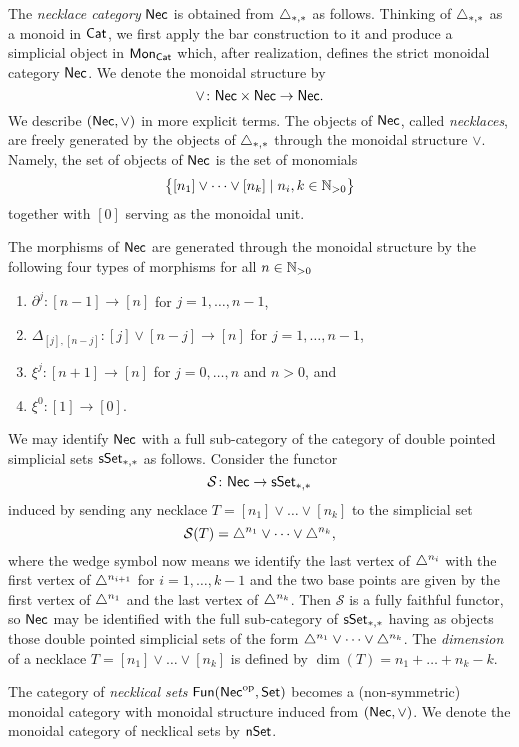 The \textit{necklace category} $\mathsf{Nec}$ is obtained from $\triangle_{*,*}$ as follows.
Thinking of $\triangle_{*,*}$ as a monoid in $\mathsf{Cat}$, we first apply the bar construction to it and produce a simplicial object in $\mathsf{Mon}_{\mathsf{Cat}}$ which, after realization, defines the strict monoidal category $\mathsf{Nec}$.
We denote the monoidal structure by
\[
\vee \colon \mathsf{Nec} \times \mathsf{Nec} \to \mathsf{Nec}.
\]
We describe $(\mathsf{Nec}, \vee)$ in more explicit terms.
The objects of $\mathsf{Nec}$, called \textit{necklaces}, are freely generated by the objects of $\triangle_{*,*}$ through the monoidal structure $\vee$.
Namely, the set of objects of $\mathsf{Nec}$ is the set of monomials
\[
\big\{ [n_1] \vee \dots \vee[n_k] \mid n_i, k \in \mathbb{N}_{>0} \big\}
\]
together with $[0]$ serving as the monoidal unit.

The morphisms of $\mathsf{Nec}$ are generated through the monoidal structure by the following four types of morphisms for all $n \in\mathbb{N}_{>0}$
\begin{enumerate}
	\item $\partial^j \colon [n-1] \to [n]$ for $j = 1, \dots, n-1$,
	\item $\Delta_{[j], [n-j]} \colon [j] \vee [n-j] \to [n]$ for $j = 1, \dots, n-1$,
	\item $\xi^j \colon [n+1] \to [n]$ for $j = 0, \dots, n$ and $n>0$, and
	\item $\xi^0 \colon [1] \to [0]$.
\end{enumerate}
We may identify $\mathsf{Nec}$ with a full sub-category of the category of double pointed simplicial sets $\mathsf{sSet}_{*,*}$ as follows.
Consider the functor
\[
\mathcal{S} \colon \mathsf{Nec} \to \mathsf{sSet}_{*,*}
\]
induced by sending any necklace $T = [n_1] \vee \dots \vee[n_k]$ to the simplicial set
\[
\mathcal{S}(T) = \triangle^{n_1} \vee \dots \vee \triangle^{n_k},
\]
where the wedge symbol now means we identify the last vertex of $\triangle^{n_i}$ with the first vertex of $\triangle^{n_{i+1}}$ for $i = 1, \dots, k-1$ and the two base points are given by the first vertex of $\triangle^{n_1}$ and the last vertex of $\triangle^{n_k}$.
Then $\mathcal{S}$ is a fully faithful functor, so $\mathsf{Nec}$ may be identified with the full sub-category of $\mathsf{sSet}_{*,*}$ having as objects those double pointed simplicial sets of the form $\triangle^{n_1} \vee \dots \vee \triangle^{n_k}$.
The \textit{dimension} of a necklace $T = [n_1] \vee\dots\vee [n_k]$ is defined by $\dim(T) = n_1 + \dots + n_k-k$.

The category of \textit{necklical sets} $\mathsf{Fun}(\mathsf{Nec}^{\mathrm{op}}, \mathsf{Set})$ becomes a (non-symmetric) monoidal category with monoidal structure induced from $(\mathsf{Nec}, \vee)$.
We denote the monoidal category of necklical sets by $\mathsf{nSet}$.

